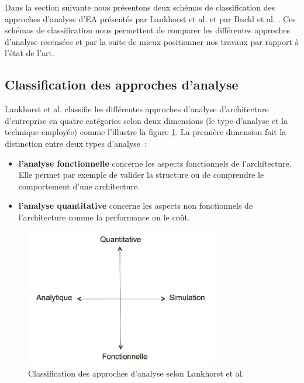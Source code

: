 
Dans la section suivante nous présentons deux schémas de classification des approches d'analyse d'EA présentés par Lankhorst et al. \cite{lankhorst2013enterprise} et par Buckl et al. \cite{buckl2009classifying}. Ces schémas de classification nous permettent de comparer les différentes approches d'analyse recensées et par la suite de mieux positionner nos travaux par rapport à l'état de l'art.


	\subsection{Classification des approches d'analyse}
Lankhorst et al. \cite{lankhorst2013enterprise} classifie les différentes approches d'analyse d'architecture d'entreprise en quatre catégories selon deux dimensions (le type d'analyse et la technique employée) comme l'illustre la figure \ref{fig:classLankhorst}. La première dimension fait la distinction entre deux types d'analyse~:
	\begin{itemize}
		\item \textbf{l'analyse fonctionnelle} concerne les aspects fonctionnels de l'architecture. Elle permet par exemple de valider la structure ou de comprendre le comportement d'une architecture.
		\item \textbf{l'analyse quantitative} concerne les aspects non fonctionnels de l'architecture comme la performance ou le coût. 
\end{itemize}

\begin{figure}[!htbp]
 \begin{center}
  \includegraphics[width=0.75\textwidth]{figures/images/Chapitre1/dimesionsLankhorts.png}
 \end{center}
 \caption{Classification des approches d'analyse selon Lankhorst et al. \protect\cite{lankhorst2013enterprise}}
 \label{fig:classLankhorst}
\end{figure}

